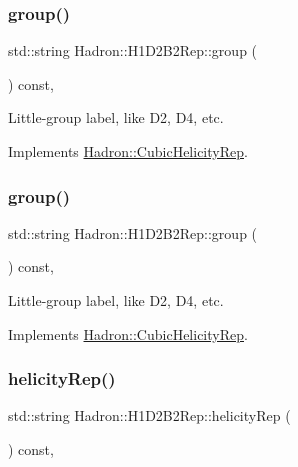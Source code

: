 \subsubsection{\texorpdfstring{group()}{group()}\hspace{0.1cm}{\footnotesize\ttfamily [2/3]}}
{\footnotesize\ttfamily std\+::string Hadron\+::\+H1\+D2\+B2\+Rep\+::group (\begin{DoxyParamCaption}{ }\end{DoxyParamCaption}) const\hspace{0.3cm}{\ttfamily [inline]}, {\ttfamily [virtual]}}

Little-\/group label, like D2, D4, etc. 

Implements \mbox{\hyperlink{structHadron_1_1CubicHelicityRep_a101a7d76cd8ccdad0f272db44b766113}{Hadron\+::\+Cubic\+Helicity\+Rep}}.

\mbox{\label{structHadron_1_1H1D2B2Rep_ab0fa365d2ca739de8c62328e3e053deb}} 
\subsubsection{\texorpdfstring{group()}{group()}\hspace{0.1cm}{\footnotesize\ttfamily [3/3]}}
{\footnotesize\ttfamily std\+::string Hadron\+::\+H1\+D2\+B2\+Rep\+::group (\begin{DoxyParamCaption}{ }\end{DoxyParamCaption}) const\hspace{0.3cm}{\ttfamily [inline]}, {\ttfamily [virtual]}}

Little-\/group label, like D2, D4, etc. 

Implements \mbox{\hyperlink{structHadron_1_1CubicHelicityRep_a101a7d76cd8ccdad0f272db44b766113}{Hadron\+::\+Cubic\+Helicity\+Rep}}.

\mbox{\label{structHadron_1_1H1D2B2Rep_a062fbbb46713530665aa762d773fa6f6}} 
\subsubsection{\texorpdfstring{helicityRep()}{helicityRep()}\hspace{0.1cm}{\footnotesize\ttfamily [1/2]}}
{\footnotesize\ttfamily std\+::string Hadron\+::\+H1\+D2\+B2\+Rep\+::helicity\+Rep (\begin{DoxyParamCaption}{ }\end{DoxyParamCaption}) const\hspace{0.3cm}{\ttfamily [inline]}, {\ttfamily [virtual]}}

